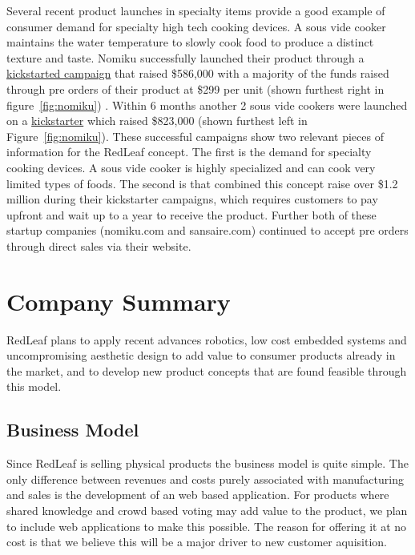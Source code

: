 \documentclass[11pt]{article}
\theoremstyle{definition}
\begin{document}
	Several recent product launches in specialty items provide a good example of consumer demand for specialty high tech cooking devices. A sous vide cooker maintains the water temperature to slowly cook food to produce a distinct texture and taste. Nomiku successfully launched their product through a \href{http://www.kickstarter.com/projects/seattlefoodgeek/sansaire-sous-vide-circulator-for-199}{ kickstarted campaign} that raised \$586,000 with a majority of the funds raised through pre orders of their product at \$299 per unit (shown furthest right in figure~\ref{fig:nomiku}) . Within 6 months another 2 sous vide cookers were launched on a \href{http://www.kickstarter.com/projects/seattlefoodgeek/sansaire-sous-vide-circulator-for-199}{kickstarter} which raised \$823,000 (shown furthest left in Figure~\ref{fig:nomiku}). These successful campaigns show two relevant pieces of information for the RedLeaf concept. The first is the demand for specialty cooking devices. A sous vide cooker is highly specialized and can cook very limited types of foods. The second is that combined this concept raise over \$1.2 million during their kickstarter campaigns, which requires customers to pay upfront and wait up to a year to receive the product. Further both of these startup companies (nomiku.com and sansaire.com) continued to accept pre orders through direct sales via their website. 





\section{Company Summary}

RedLeaf plans to apply recent advances robotics, low cost embedded systems and uncompromising aesthetic design to add value to consumer products already in the market, and to develop new product concepts that are found feasible through this model.


\subsection{Business Model}

Since RedLeaf is selling physical products the business model is quite simple. The only difference between revenues and costs purely associated with manufacturing and sales is the development of an web based application. For products where shared knowledge and crowd based voting may add value to the product, we plan to include web applications to make this possible. The reason for offering it at no cost is that we believe this will be a major driver to new customer aquisition.
\end{document}
